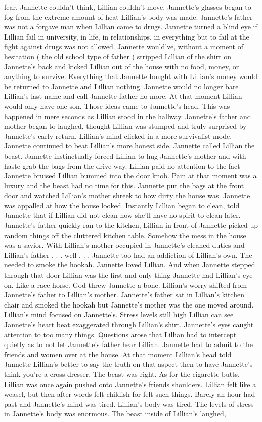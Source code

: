 \documentclass[12pt]{book}
\begin{document}
fear. Jannette couldn't think, Lillian couldn't move. Jannette's glasses began to fog from the extreme amount of heat Lillian's body was made. Jannette's father was not a forgave man when Lillian came to drugs. Jannette turned a blind eye if Lillian fail in university, in life, in relationships, in everything but to fail at the fight against drugs was not allowed. Jannette would've, without a moment of hesitation ( the old school type of father ) stripped Lillian of the shirt on Jannette's back and kicked Lillian out of the house with no food, money, or anything to survive. Everything that Jannette bought with Lillian's money would be returned to Jannette and Lillian nothing. Jannette would no longer bare Lillian's last name and call Jannette father no more. At that moment Lillian would only have one son. Those ideas came to Jannette's head. This was happened in mere seconds as Lillian stood in the hallway. Jannette's father and mother began to laughed, thought Lillian was stumped and truly surprised by Jannette's early return. Lillian's mind clicked in a more survivalist mode. Jannette continued to beat Lillian's more honest side. Jannette called Lillian the beast. Jannette instinctually forced Lillian to hug Jannette's mother and with haste grab the bags from the drive way. Lillian paid no attention to the fact Jannette bruised Lillian bummed into the door knob. Pain at that moment was a luxury and the beast had no time for this. Jannette put the bags at the front door and watched Lillian's mother shreek to how dirty the house was. Jannette was appalled at how the house looked. Instantly Lillian began to clean, told Jannette that if Lillian did not clean now she'll have no spirit to clean later. Jannette's father quickly ran to the kitchen, Lillian in front of Jannette picked up random things off the cluttered kitchen table. Somehow the mess in the house was a savior. With Lillian's mother occupied in Jannette's cleaned duties and Lillian's father . . .  well . . .  Jannette too had an addiction of Lillian's own. The needed to smoke the hookah. Jannette loved Lillian. And when Jannette stepped through that door Lillian was the first and only thing Jannette had Lillian's eye on. Like a race horse. God threw Jannette a bone. Lillian's worry shifted from Jannette's father to Lillian's mother. Jannette's father sat in Lillian's kitchen chair and smoked the hookah but Jannette's mother was the one moved around. Lillian's mind focused on Jannette's. Stress levels still high Lillian can see Jannette's heart beat exaggerated through Lillian's shirt. Jannette's eyes caught attention to too many things. Questions arose that Lillian had to intercept quietly as to not let Jannette's father hear Lillian. Jannette had to admit to the friends and women over at the house. At that moment Lillian's head told Jannette Lillian's better to say the truth on that aspect then to have Jannette's think you're a cross dresser. The beast was right. As for the cigarette butts, Lillian was once again pushed onto Jannette's friends shoulders. Lillian felt like a weasel, but then after words felt childish for felt such things. Barely an hour had past and Jannette's mind was tired. Lillian's body was tired. The levels of stress in Jannette's body was enormous. The beast inside of Lillian's laughed, 
\end{document}
